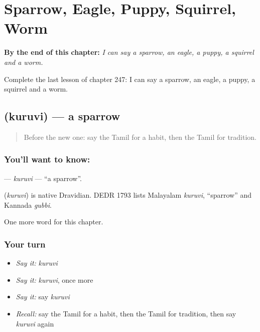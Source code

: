 
\chapter{Sparrow, Eagle, Puppy, Squirrel, Worm}
\label{ch:ta-sparrow-eagle-puppy-squirrel-worm}

\begin{chapteropening}
\textbf{By the end of this chapter:} \emph{I can say a sparrow, an eagle, a puppy, a squirrel and a worm.}

Complete the last lesson of chapter 247: I can say a sparrow, an eagle, a puppy, a squirrel and a worm.
\end{chapteropening}

\section[\texorpdfstring{\ta{குருவி} (kuruvi)}{குருவி (kuruvi)}]{ (kuruvi) — a sparrow}

\label{lesson:TA-C247-kuruvi}



\begin{quote}
Before the new one: say the Tamil for a habit, then the Tamil for tradition.
\end{quote}

\subsection*{You'll want to know: }
\textbf{} — \emph{kuruvi} — \textquotedblleft{}a sparrow\textquotedblright{}.

\begin{cousinweb}
\textbf{} (\emph{kuruvi}) is native Dravidian. DEDR 1793 lists Malayalam \emph{kuruvi}, \textquotedblleft{}sparrow\textquotedblright{} and Kannada \emph{gubbi}.
\end{cousinweb}

\begin{grammarlens}[title={What you've built}]
One more word for this chapter.
\end{grammarlens}

\subsection*{Your turn}
\begin{itemize}
\raggedright
  \item \emph{Say it:} \emph{kuruvi}
  \item \emph{Say it:} \emph{kuruvi}, once more
  \item \emph{Say it:} say \emph{kuruvi}
  \item \emph{Recall:} say the Tamil for a habit, then the Tamil for tradition, then say \emph{kuruvi} again
\end{itemize}

